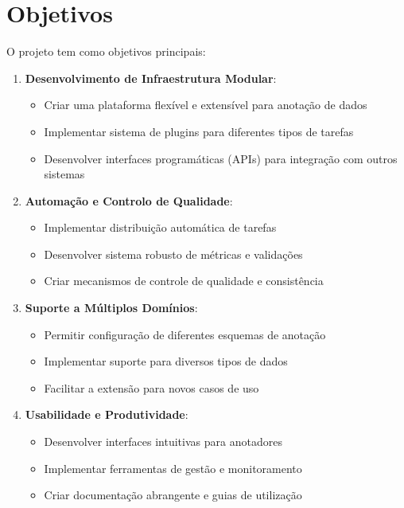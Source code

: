 \section{Objetivos}

O projeto tem como objetivos principais:

\begin{enumerate}
    \item \textbf{Desenvolvimento de Infraestrutura Modular}:
    \begin{itemize}
        \item Criar uma plataforma flexível e extensível para anotação de dados
        \item Implementar sistema de plugins para diferentes tipos de tarefas
        \item Desenvolver interfaces programáticas (APIs) para integração com outros sistemas
    \end{itemize}

    \item \textbf{Automação e Controlo de Qualidade}:
    \begin{itemize}
        \item Implementar distribuição automática de tarefas
        \item Desenvolver sistema robusto de métricas e validações
        \item Criar mecanismos de controle de qualidade e consistência
    \end{itemize}

    \item \textbf{Suporte a Múltiplos Domínios}:
    \begin{itemize}
        \item Permitir configuração de diferentes esquemas de anotação
        \item Implementar suporte para diversos tipos de dados
        \item Facilitar a extensão para novos casos de uso
    \end{itemize}

    \item \textbf{Usabilidade e Produtividade}:
    \begin{itemize}
        \item Desenvolver interfaces intuitivas para anotadores
        \item Implementar ferramentas de gestão e monitoramento
        \item Criar documentação abrangente e guias de utilização
    \end{itemize}
\end{enumerate}

